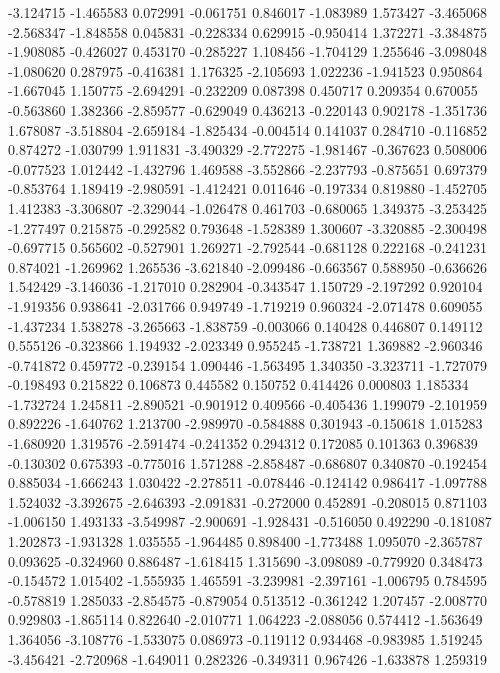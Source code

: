-3.124715
-1.465583
0.072991
-0.061751
0.846017
-1.083989
1.573427
-3.465068
-2.568347
-1.848558
0.045831
-0.228334
0.629915
-0.950414
1.372271
-3.384875
-1.908085
-0.426027
0.453170
-0.285227
1.108456
-1.704129
1.255646
-3.098048
-1.080620
0.287975
-0.416381
1.176325
-2.105693
1.022236
-1.941523
0.950864
-1.667045
1.150775
-2.694291
-0.232209
0.087398
0.450717
0.209354
0.670055
-0.563860
1.382366
-2.859577
-0.629049
0.436213
-0.220143
0.902178
-1.351736
1.678087
-3.518804
-2.659184
-1.825434
-0.004514
0.141037
0.284710
-0.116852
0.874272
-1.030799
1.911831
-3.490329
-2.772275
-1.981467
-0.367623
0.508006
-0.077523
1.012442
-1.432796
1.469588
-3.552866
-2.237793
-0.875651
0.697379
-0.853764
1.189419
-2.980591
-1.412421
0.011646
-0.197334
0.819880
-1.452705
1.412383
-3.306807
-2.329044
-1.026478
0.461703
-0.680065
1.349375
-3.253425
-1.277497
0.215875
-0.292582
0.793648
-1.528389
1.300607
-3.320885
-2.300498
-0.697715
0.565602
-0.527901
1.269271
-2.792544
-0.681128
0.222168
-0.241231
0.874021
-1.269962
1.265536
-3.621840
-2.099486
-0.663567
0.588950
-0.636626
1.542429
-3.146036
-1.217010
0.282904
-0.343547
1.150729
-2.197292
0.920104
-1.919356
0.938641
-2.031766
0.949749
-1.719219
0.960324
-2.071478
0.609055
-1.437234
1.538278
-3.265663
-1.838759
-0.003066
0.140428
0.446807
0.149112
0.555126
-0.323866
1.194932
-2.023349
0.955245
-1.738721
1.369882
-2.960346
-0.741872
0.459772
-0.239154
1.090446
-1.563495
1.340350
-3.323711
-1.727079
-0.198493
0.215822
0.106873
0.445582
0.150752
0.414426
0.000803
1.185334
-1.732724
1.245811
-2.890521
-0.901912
0.409566
-0.405436
1.199079
-2.101959
0.892226
-1.640762
1.213700
-2.989970
-0.584888
0.301943
-0.150618
1.015283
-1.680920
1.319576
-2.591474
-0.241352
0.294312
0.172085
0.101363
0.396839
-0.130302
0.675393
-0.775016
1.571288
-2.858487
-0.686807
0.340870
-0.192454
0.885034
-1.666243
1.030422
-2.278511
-0.078446
-0.124142
0.986417
-1.097788
1.524032
-3.392675
-2.646393
-2.091831
-0.272000
0.452891
-0.208015
0.871103
-1.006150
1.493133
-3.549987
-2.900691
-1.928431
-0.516050
0.492290
-0.181087
1.202873
-1.931328
1.035555
-1.964485
0.898400
-1.773488
1.095070
-2.365787
0.093625
-0.324960
0.886487
-1.618415
1.315690
-3.098089
-0.779920
0.348473
-0.154572
1.015402
-1.555935
1.465591
-3.239981
-2.397161
-1.006795
0.784595
-0.578819
1.285033
-2.854575
-0.879054
0.513512
-0.361242
1.207457
-2.008770
0.929803
-1.865114
0.822640
-2.010771
1.064223
-2.088056
0.574412
-1.563649
1.364056
-3.108776
-1.533075
0.086973
-0.119112
0.934468
-0.983985
1.519245
-3.456421
-2.720968
-1.649011
0.282326
-0.349311
0.967426
-1.633878
1.259319
